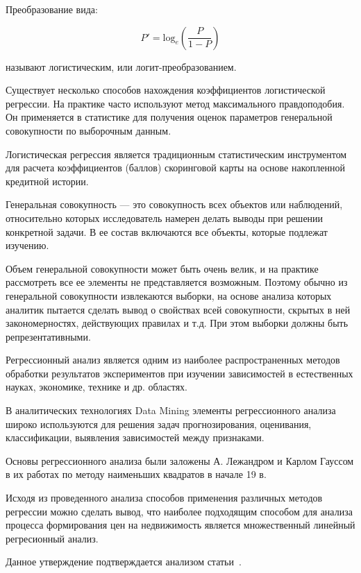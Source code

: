 Преобразование вида:

\begin{equation}
	{P'} =  \text{log}_{e}(\frac{P}{1-P})
\end{equation}

называют логистическим, или логит-преобразованием.

Существует несколько способов нахождения коэффициентов логистической регрессии. На практике часто используют метод
максимального правдоподобия. Он применяется в статистике для получения оценок параметров генеральной совокупности по
выборочным данным.

Логистическая регрессия является традиционным статистическим инструментом для расчета коэффициентов (баллов) скоринговой
карты на основе накопленной кредитной истории.

Генеральная совокупность — это совокупность всех объектов или наблюдений, относительно которых исследователь намерен
делать выводы при решении конкретной задачи. В ее состав включаются все объекты, которые подлежат изучению.

Объем генеральной совокупности может быть очень велик, и на практике рассмотреть все ее элементы не представляется
возможным. Поэтому обычно из генеральной совокупности извлекаются выборки, на основе анализа которых аналитик пытается
сделать вывод о свойствах всей совокупности, скрытых в ней закономерностях, действующих правилах и т.д. При этом выборки
должны быть репрезентативными.

Регрессионный анализ является одним из наиболее распространенных методов обработки результатов экспериментов при
изучении зависимостей в естественных науках, экономике, технике и др. областях.

В аналитических технологиях Data Mining элементы регрессионного анализа широко используются для решения задач
прогнозирования, оценивания, классификации, выявления зависимостей между признаками.

Основы регрессионного анализа были заложены А. Лежандром и Карлом Гауссом в их работах по методу наименьших квадратов в
начале 19 в.~\cite{regression_analysis}

Исходя из проведенного анализа способов применения различных методов регрессии можно сделать вывод, что наиболее
подходящим способом для анализа процесса формирования цен на недвижимость является множественный линейный регресионный
анализ.

Данное утверждение подтверждается анализом статьи~\cite{using_regression_analysis}.

